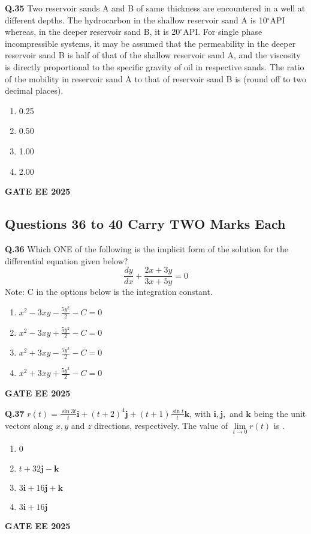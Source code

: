 \documentclass{article}
\begin{document}
\vspace{0.5cm}

\textbf{Q.35} Two reservoir sands A and B of same thickness are encountered in a well at different depths. The hydrocarbon in the shallow reservoir sand A is 10$^\circ$API whereas, in the deeper reservoir sand B, it is 20$^\circ$API. For single phase incompressible systems, it may be assumed that the permeability in the deeper reservoir sand B is half of that of the shallow reservoir sand A, and the viscosity is directly proportional to the specific gravity of oil in respective sands. The ratio of the mobility in reservoir sand A to that of reservoir sand B is \underline{\hspace{1cm}} (round off to two decimal places).
\begin{enumerate}[label=(\Alph*)]
    \item 0.25
    \item 0.50
    \item 1.00
    \item 2.00
\end{enumerate}
\textbf{GATE EE 2025}

\vspace{0.5cm}

\subsection*{Questions 36 to 40 Carry TWO Marks Each}

\textbf{Q.36} Which ONE of the following is the implicit form of the solution for the differential equation given below?
\[ \frac{dy}{dx} + \frac{2x+3y}{3x+5y} = 0 \]
Note: C in the options below is the integration constant.
\begin{enumerate}[label=(\Alph*)]
    \item $x^2 - 3xy - \frac{5y^2}{2} - C = 0$
    \item $x^2 - 3xy + \frac{5y^2}{2} - C = 0$
    \item $x^2 + 3xy - \frac{5y^2}{2} - C = 0$
    \item $x^2 + 3xy + \frac{5y^2}{2} - C = 0$
\end{enumerate}
\textbf{GATE EE 2025}

\vspace{0.5cm}

\textbf{Q.37} $r(t) = \frac{\sin 3t}{t} \mathbf{i} + (t + 2)^4 \mathbf{j} + (t + 1)\frac{\sin t}{t} \mathbf{k}$, with $\mathbf{i}, \mathbf{j},$ and $\mathbf{k}$ being the unit vectors along $x, y$ and $z$ directions, respectively. The value of $\lim\limits_{t \to 0} r(t)$ is \underline{\hspace{1cm}}.
\begin{enumerate}[label=(\Alph*)]
    \item 0
    \item $t + 32\mathbf{j} - \mathbf{k}$
    \item $3\mathbf{i} + 16\mathbf{j} + \mathbf{k}$
    \item $3\mathbf{i} + 16\mathbf{j}$
\end{enumerate}
\textbf{GATE EE 2025}
\end{document}
